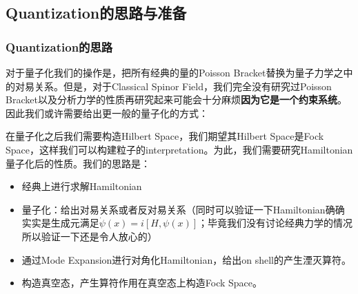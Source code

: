 \subsection{Quantization的思路与准备}

\subsubsection{Quantization的思路}


对于量子化我们的操作是，把所有经典的量的Poisson Bracket替换为量子力学之中的对易关系。但是，对于Classical
Spinor Field，我们完全没有研究过Poisson
Bracket以及分析力学的性质再研究起来可能会十分麻烦\textbf{因为它是一个约束系统}。因此我们或许需要给出更一般的量子化的方式：

\bigskip
{}

在量子化之后我们需要构造Hilbert Space，我们期望其Hilbert Space是Fock
Space，这样我们可以构建粒子的interpretation。为此，我们需要研究Hamiltonian量子化后的性质。我们的思路是：
\begin{itemize}
  \item 经典上进行求解Hamiltonian
  \item 量子化：给出对易关系或者反对易关系（同时可以验证一下Hamiltonian确确实实是生成元满足$
    \dot{\psi}(x) = i\left[H,\psi(x)\right] $；毕竟我们没有讨论经典力学的情况所以验证一下还是令人放心的）
  \item 通过Mode Expansion进行对角化Hamiltonian，给出on shell的产生湮灭算符。
  \item 构造真空态，产生算符作用在真空态上构造Fock Space。
\end{itemize}

